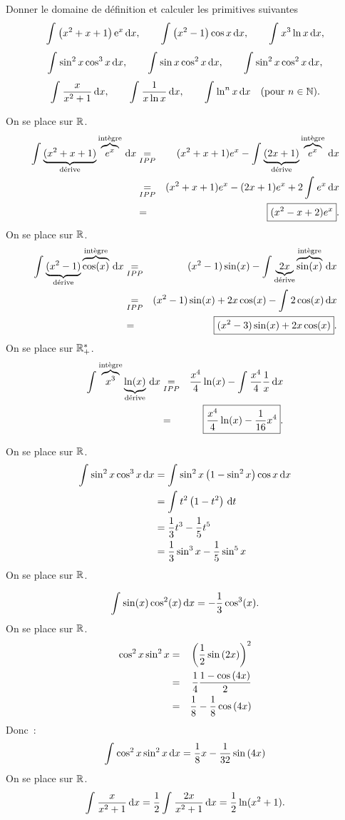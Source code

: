 \documentclass{magnolia}
\begin{document}
Donner le domaine de définition et calculer les primitives suivantes
\[\int_{}^{} \left(x^2+x+1\right){\rm e}^x\,\text{d}x, \qquad \int_{}^{} \left(x^2-1\right)\cos x\,\text{d}x, \qquad
  \int_{}^{} x^3\ln x\,\text{d}x,\]
\[\int_{}^{} \sin^2 x\cos^3 x\,\text{d}x, \qquad \int_{}^{} \sin x\cos^2 x\,\text{d}x, \qquad
  \int_{}^{} \sin^2 x\cos^2 x\,\text{d}x,\]
\[\int_{}^{} \frac{x}{x^2+1}\,\text{d}x, \qquad \int_{}^{} \frac{1}{x\ln x}\,\text{d}x, \qquad
  \int_{}^{} \ln^n x\,\text{d}x \quad (\text{pour $n\in\mathbb{N}$}).\]


\begin{sol}
\begin{questions}
\question On se place sur $\mathbb{R}$.
\begin{eqnarray*}
\int_{}^{} \underbrace{(x^2+x+1)}_{\text{d\'erive}} \overbrace{e^x}^{\text{int\`egre}}\,\text{d}x&\underset{IPP}{=}&(x^2+x+1)e^x-\int_{}^{} \underbrace{(2x+1)}_{\text{d\'erive}} \overbrace{e^x}^{\text{int\`egre}}\,\text{d}x\\
&\underset{IPP}{=}&(x^2+x+1)e^x-(2x+1)e^x+2\int_{}^{} e^x\,\text{d}x\\
&=&\boxed{(x^2-x+2)e^x} .
\end{eqnarray*}
\question On se place sur $\mathbb{R}$.
\begin{eqnarray*}
\int_{}^{} \underbrace{(x^2-1)}_{\text{d\'erive}} \overbrace{\cos(x)}^{\text{int\`egre}}\,\text{d}x&\underset{IPP}{=}&(x^2-1)\sin(x)-\int_{}^{} \underbrace{2x}_{\text{d\'erive}} \overbrace{\sin(x)}^{\text{int\`egre}}\,\text{d}x\\
&\underset{IPP}{=}&(x^2-1)\sin(x)+2x\cos(x)-\int_{}^{} 2\cos(x)\,\text{d}x\\
&=&\boxed{(x^2-3)\sin(x)+2x\cos(x)} .
\end{eqnarray*}
\question On se place sur $\mathbb{R}_+^*$.
\begin{eqnarray*}
\int_{}^{} \overbrace{x^3}^{\text{int\`egre}} \underbrace{\ln(x)}_{\text{d\'erive}}\,\text{d}x&\underset{IPP}{=}&\frac{x^4}{4}\ln(x)-\int_{}^{} \frac{x^4}{4}\frac{1}{x}\,\text{d}x\\
&=&\boxed{\frac{x^4}{4}\ln(x)-\frac{1}{16}x^4} .
\end{eqnarray*}

\question On se place sur $\mathbb{R}$.
\begin{equation*}
    \begin{split}
    \int_{}^{} \sin^2 x\cos^3 x\,\text{d}x&=\int_{}^{} \sin^2 x \left(1-\sin^2 x\right)\cos x\,\text{d}x\\
                              &=\int_{}^{} t^2\left(1-t^2\right)\,\text{d}t\\
                              &=\frac{1}{3}t^3-\frac{1}{5}t^5\\
                              &=\frac{1}{3}\sin^3 x-\frac{1}{5}\sin^5 x\\
    \end{split}
    \end{equation*}    
\question On se place sur $\mathbb{R}$.

$$\int_{}^{} \sin(x)\cos^2(x)\,\text{d}x=-\frac{1}{3}\cos^3(x).$$
\question On se place sur $\mathbb{R}$.
    \begin{eqnarray*}
    \cos^2 x\sin^2 x&=&\left(\frac{1}{2}\sin\left(2x\right)\right)^2\\
     &=&\frac{1}{4}\frac{1-\cos\left(4x\right)}{2}\\
     &=&\frac{1}{8}-\frac{1}{8}\cos\left(4x\right)
    \end{eqnarray*}
    Donc~:
    $$\int_{}^{} \cos^2 x\sin^2 x\,\text{d}x=\frac{1}{8}x-\frac{1}{32}\sin\left(4x\right)$$
\question On se place sur $\mathbb{R}$.
$$\int_{}^{} \frac{x}{x^2+1}\,\text{d}x=\frac{1}{2}\int_{}^{} \frac{2x}{x^2+1}\,\text{d}x=\frac{1}{2}\ln(x^2+1).$$


\end{questions}
\end{sol}
\end{document}
